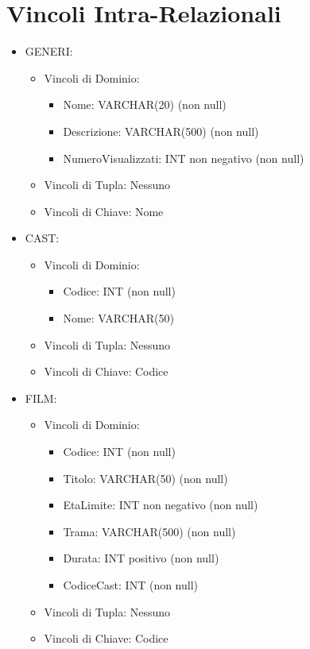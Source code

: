 \documentclass[a4paper,12pt]{report}
\begin{document}
\section{Vincoli Intra-Relazionali}
\begin{itemize}
	\item GENERI:
	\begin{itemize}
		\item Vincoli di Dominio:
			\begin{itemize}
				\item Nome: VARCHAR(20) (non null)
				\item Descrizione: VARCHAR(500) (non null)
				\item NumeroVisualizzati: INT non negativo (non null)
			\end{itemize}
		\item Vincoli di Tupla: Nessuno
		\item Vincoli di Chiave: Nome
	\end{itemize}
	\item CAST:
	\begin{itemize}
		\item Vincoli di Dominio:
		\begin{itemize}
			\item Codice: INT (non null)
			\item Nome: VARCHAR(50)
		\end{itemize}
		\item Vincoli di Tupla: Nessuno
		\item Vincoli di Chiave: Codice
	\end{itemize}
	\item FILM:
	\begin{itemize}
		\item Vincoli di Dominio:
		\begin{itemize}
			\item Codice: INT (non null)
			\item Titolo: VARCHAR(50) (non null)
			\item EtaLimite: INT non negativo (non null)
			\item Trama: VARCHAR(500) (non null)
			\item Durata: INT positivo (non null)
			\item CodiceCast: INT (non null)
		\end{itemize}
		\item Vincoli di Tupla: Nessuno
		\item Vincoli di Chiave: Codice
	\end{itemize}

\end{itemize}
\end{document}
